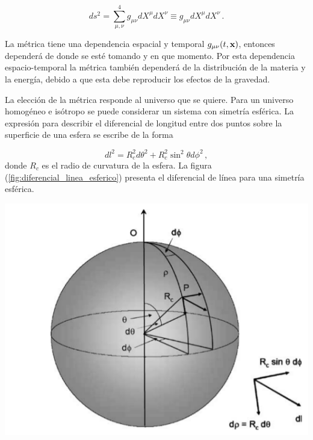 \begin{equation}
ds^{2}=\sum_{\mu,\nu}^{4} g_{\mu\nu}dX^{\mu}dX^{\nu} \equiv g_{\mu\nu}dX^{\mu}dX^{\nu} \,.
\label{eq:tensor_metrico}
\end{equation}

La métrica tiene una dependencia espacial y temporal $g_{\mu\nu}(t,{\bf{x}})$, entonces dependerá de donde se esté tomando y en que momento. Por esta dependencia espacio-temporal la métrica también dependerá de la distribución de la materia y la energía, debido a que esta debe reproducir los efectos de la gravedad.

La elección de la métrica responde al universo que se quiere. Para un universo homogéneo e isótropo se puede considerar un sistema con simetría esférica. La expresión para describir el diferencial de longitud entre dos puntos sobre la superficie de una esfera se escribe de la forma

\begin{equation}
dl^{2}=R_{c}^{2}d\theta^{2}+R_{c}^{2}\sin^{2}\theta d\phi^{2} \,,
\label{metrica_esfera}
\end{equation}
%
donde $R_{c}$ es el radio de curvatura de la esfera. La figura (\ref{fig:diferencial_linea_esferico}) presenta el diferencial de línea para una simetría esférica.


\begin{center}
\includegraphics[scale=.4]{./figures/2_theoretical_framework/diferencial_linea.png}
\label{fig:diferencial_linea_esferico}
\end{center}

